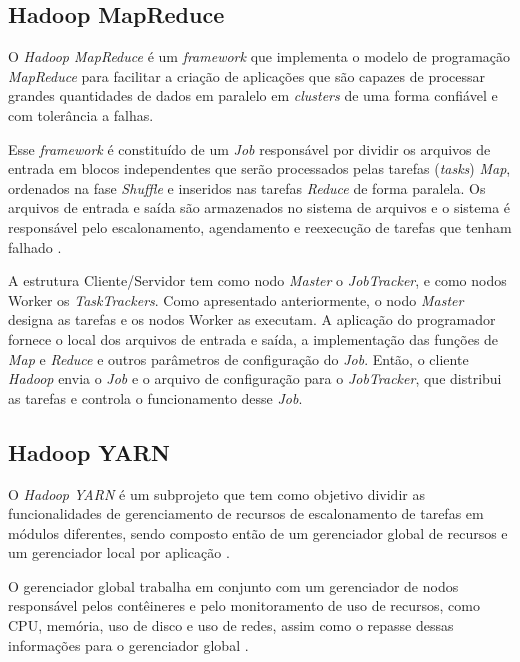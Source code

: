 \subsection{Hadoop MapReduce} \label{ssec:hadoopmapreduce}

O \textit{Hadoop MapReduce} é um \textit{\gls{framework}} que implementa o modelo de programação \textit{MapReduce} para facilitar a criação de aplicações que são capazes de processar grandes quantidades de dados em paralelo em \textit{clusters} de uma forma confiável e com tolerância a falhas. 

Esse \textit{\gls{framework}} é constituído de um \textit{Job} responsável por dividir os arquivos de entrada em blocos independentes que serão processados pelas tarefas (\textit{tasks}) \textit{Map}, ordenados na fase \textit{Shuffle} e inseridos nas tarefas \textit{Reduce} de forma paralela. Os arquivos de entrada e saída são armazenados no sistema de arquivos e o sistema é responsável pelo escalonamento, agendamento e reexecução de tarefas que tenham falhado \cite{HadoopMapReduce22}.

A estrutura Cliente/Servidor tem como nodo \textit{Master} o \textit{JobTracker}, e como nodos Worker os \textit{TaskTrackers}. Como apresentado anteriormente, o nodo \textit{Master} designa as tarefas e os nodos Worker as executam. A aplicação do programador fornece o local dos arquivos de entrada e saída, a implementação das funções de \textit{Map} e \textit{Reduce} e outros parâmetros de configuração do \textit{Job}. Então, o cliente \textit{Hadoop} envia o \textit{Job} e o arquivo de configuração para o \textit{JobTracker}, que distribui as tarefas e controla o funcionamento desse \textit{Job}.

\subsection{Hadoop YARN} \label{ssec:hadoopyarn}

O \textit{Hadoop YARN} é um subprojeto que tem como objetivo dividir as funcionalidades de gerenciamento de recursos de escalonamento de tarefas em módulos diferentes, sendo composto então de um gerenciador global de recursos e um gerenciador local por aplicação \cite{GoldmanApache12}. 

O gerenciador global trabalha em conjunto com um gerenciador de nodos responsável pelos contêineres e pelo monitoramento de uso de recursos, como CPU, memória, uso de disco e uso de redes, assim como o repasse dessas informações para o gerenciador global \cite{HadoopYarn22}.

